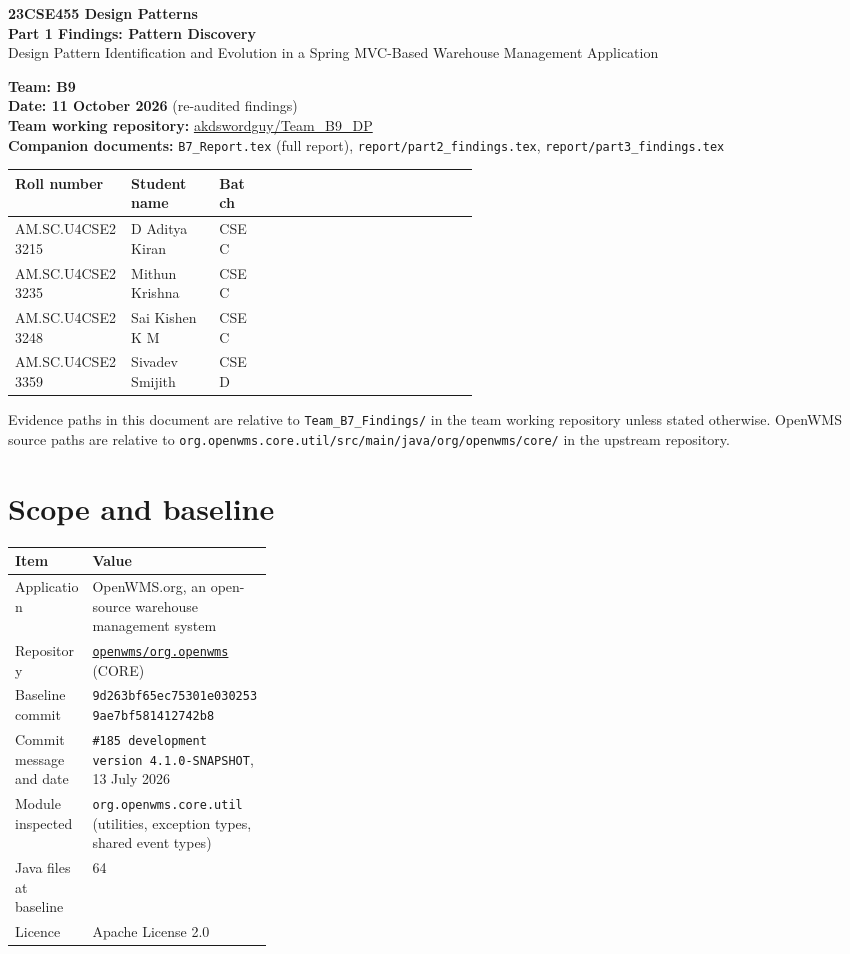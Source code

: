\documentclass[11pt,a4paper]{article}
\title{}
\author{}
\date{}
\newcommand{\code}[1]{\nolinkurl{#1}}
\begin{document}
\begin{center}
{\Large\textbf{23CSE455 Design Patterns}}\\[4pt]
{\LARGE\textbf{Part 1 Findings: Pattern Discovery}}\\[6pt]
{\large Design Pattern Identification and Evolution in a Spring MVC-Based Warehouse Management Application}
\end{center}

\textbf{Team: B9}\\
\textbf{Date: 11 October 2026} (re-audited findings)\\
\textbf{Team working repository:} \href{https://github.com/akdswordguy/Team_B9_DP}{akdswordguy/Team\_B9\_DP}\\
\textbf{Companion documents:} \code{B7_Report.tex} (full report), \code{report/part2_findings.tex}, \code{report/part3_findings.tex}


\begin{tabularx}{\linewidth}{@{}P{0.25\linewidth}P{0.19\linewidth}P{0.10\linewidth}X@{}}
\toprule
Roll number & Student name & Batch \\
\midrule
AM.SC.U4CSE23215 & D Aditya Kiran & CSE C \\
AM.SC.U4CSE23235 & Mithun Krishna & CSE C \\
AM.SC.U4CSE23248 & Sai Kishen K M & CSE C\\
AM.SC.U4CSE23359 & Sivadev Smijith & CSE D \\
\bottomrule
\end{tabularx}

Evidence paths in this document are relative to \code{Team_B7_Findings/} in the team working repository unless stated otherwise. OpenWMS source paths are relative to \code{org.openwms.core.util/src/main/java/org/openwms/core/} in the upstream repository.

\section{Scope and baseline}

\begin{tabularx}{\linewidth}{@{}P{0.30\linewidth}Y@{}}
\toprule
Item & Value\\
\midrule
Application & OpenWMS.org, an open-source warehouse management system\\
Repository & \href{https://github.com/openwms/org.openwms}{\nolinkurl{openwms/org.openwms}} (CORE)\\
Baseline commit & \code{9d263bf65ec75301e0302539ae7bf581412742b8}\\
Commit message and date & \texttt{\#185 development version 4.1.0-SNAPSHOT}, 13 July 2026\\
Module inspected & \code{org.openwms.core.util} (utilities, exception types, shared event types)\\
Java files at baseline & 64\\
Licence & Apache License 2.0\\
\bottomrule
\end{tabularx}
\end{document}
